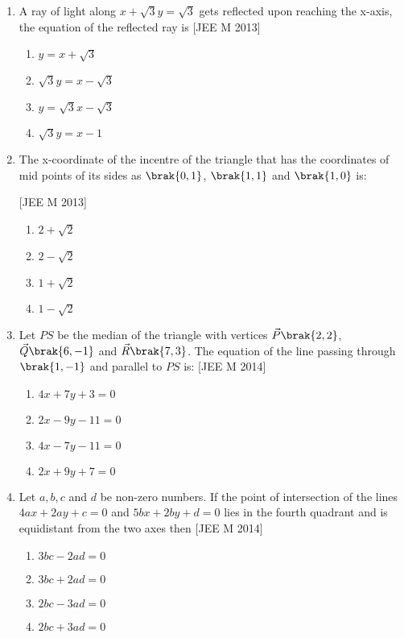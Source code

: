 \begin{enumerate}
\item A ray of light along $x+\sqrt{3}y=\sqrt{3}$ gets reflected upon reaching the x-axis, the equation of the reflected ray is \hfill{[JEE M 2013]}
\begin{multicols}{2}
\begin{enumerate}
\item $y=x+\sqrt{3}$
\item $\sqrt{3}y=x-\sqrt{3}$
\item $y=\sqrt{3}x-\sqrt{3}$
\item $\sqrt{3}y=x-1$
\end{enumerate}
\end{multicols}

\item The x-coordinate of the incentre of the triangle that has the coordinates of mid points of its sides as $\brak{0, 1}$, $\brak{1, 1}$ and $\brak{1, 0}$ is:

\hfill{[JEE M 2013]}
\begin{multicols}{4}
\begin{enumerate}
\item $2+\sqrt{2}$
\item $2-\sqrt{2}$
\item $1+\sqrt{2}$
\item $1-\sqrt{2}$
\end{enumerate}
\end{multicols}

\item Let $PS$ be the median of the triangle with vertices $\vec{P}\brak{2, 2}$, $\vec{Q}\brak{6, -1}$ and $\vec{R}\brak{7,3}$. The equation of the line passing through $\brak{1, -1}$ and parallel to $PS$ is: \hfill{[JEE M 2014]}
\begin{multicols}{2}
\begin{enumerate}
\item $4x+7y+3=0$
\item $2x-9y-11=0$
\item $4x-7y-11=0$
\item $2x+9y+7=0$
\end{enumerate}
\end{multicols}

\item Let $a, b, c$ and $d$ be non-zero numbers. If the point of intersection of the lines $4ax+2ay+c=0$ and $5bx+2by+d=0$ lies in the fourth quadrant and is equidistant from the two axes then \hfill{[JEE M 2014]}
\begin{multicols}{2}
\begin{enumerate}
\item $3bc-2ad= 0$
\item $3bc+2ad=0$
\item $2bc-3ad= 0$
\item $2bc+3ad=0$ 
\end{enumerate}
\end{multicols}


\end{enumerate}
